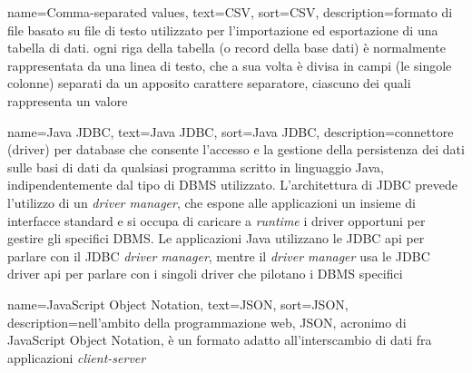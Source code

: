 {
	name=Comma-separated values,
	text=CSV,
	sort=CSV,
	description={formato di file basato su file di testo utilizzato per l'importazione ed esportazione di una tabella di dati. ogni riga della tabella (o record della base dati) è normalmente rappresentata da una linea di testo, che a sua volta è divisa in campi (le singole colonne) separati da un apposito carattere separatore, ciascuno dei quali rappresenta un valore}
}

{
	name=Java JDBC,
	text=Java JDBC,
	sort=Java JDBC,
	description={connettore (driver) per database che consente l'accesso e la gestione della persistenza dei dati sulle basi di dati da qualsiasi programma scritto in linguaggio Java, indipendentemente dal tipo di DBMS utilizzato. L'architettura di JDBC prevede l'utilizzo di un \textit{driver manager}, che espone alle applicazioni un insieme di interfacce standard e si occupa di caricare a \textit{runtime} i driver opportuni per gestire gli specifici DBMS. Le applicazioni Java utilizzano le JDBC \gls{api} per parlare con il JDBC \textit{driver manager}, mentre il \textit{driver manager} usa le JDBC driver \gls{api} per parlare con i singoli driver che pilotano i DBMS specifici}
}

{
	name=JavaScript Object Notation,
	text=JSON,
	sort=JSON,
	description={nell’ambito della programmazione web, JSON, acronimo di JavaScript Object Notation, è un formato adatto all’interscambio di dati fra applicazioni \textit{client-server}}
}